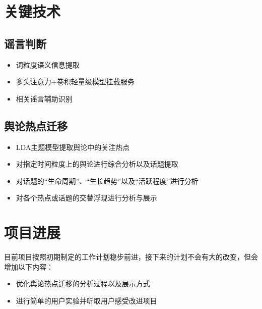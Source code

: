 \documentclass{article}
\begin{document}
\section{关键技术}
\subsection{谣言判断}
\begin{itemize}
	\item{词粒度语义信息提取}
	\item{多头注意力+卷积轻量级模型挂载服务}
	\item{相关谣言辅助识别}
\end{itemize}

\subsection{舆论热点迁移}

\begin{itemize}
	\item{LDA主题模型提取舆论中的关注热点}
	\item{对指定时间粒度上的舆论进行综合分析以及话题提取}
	\item{对话题的“生命周期”、“生长趋势”以及“活跃程度”进行分析}
	\item{对各个热点或话题的交替浮现进行分析与展示}
\end{itemize}


\section{项目进展}
目前项目按照初期制定的工作计划稳步前进，接下来的计划不会有大的改变，但会增加以下内容：
\begin{itemize}
	\item{优化舆论热点迁移的分析过程以及展示方式}
	\item{进行简单的用户实验并听取用户感受改进项目}
\end{itemize}
\end{document}
